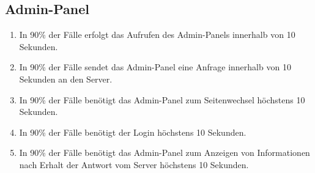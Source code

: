 \subsection{Admin-Panel}

\begin{enumerate}
    \item In 90\% der Fälle erfolgt das Aufrufen des Admin-Panels innerhalb von 10 Sekunden.
    \item In 90\% der Fälle sendet das Admin-Panel eine Anfrage innerhalb von 10 Sekunden an den Server.
    \item In 90\% der Fälle benötigt das Admin-Panel zum Seitenwechsel höchstens 10 Sekunden.
    \item In 90\% der Fälle benötigt der Login höchstens 10 Sekunden.
    \item In 90\% der Fälle benötigt das Admin-Panel zum Anzeigen von Informationen nach Erhalt der Antwort vom Server höchstens 10 Sekunden.
\end{enumerate}